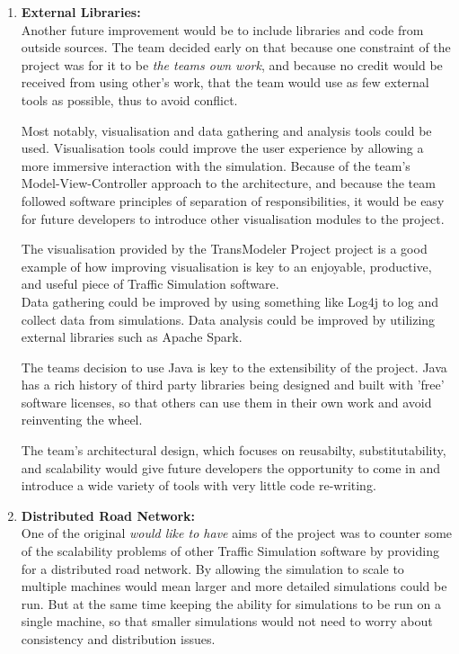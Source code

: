 \documentclass[11pt]{article}
\begin{document}
{\begin{enumerate}
\begin{enumerate}
	\item \textbf{External Libraries:}
	\\
	
	Another future improvement would be to include libraries and code from outside sources. The team decided early on that because one constraint of the project was for it to be \textit{the teams own work}, and because no credit would be received from using other's work, that the team would use as few external tools as possible, thus to avoid conflict. 
	
	Most notably, visualisation and data gathering and analysis tools could be used. Visualisation tools could improve the user experience by allowing a more immersive interaction with the simulation. Because of the team's Model-View-Controller approach to the architecture, and because the team followed software principles of separation of responsibilities, it would be easy for future developers to introduce other visualisation modules to the project.
	
	The visualisation provided by the TransModeler Project project \cite{website:caliper.com-transmodeler} is a good example of how improving visualisation is key to an enjoyable, productive, and useful piece of Traffic Simulation software.
	\\ Data gathering could be improved by using something like Log4j \cite{website:Apache-Log4j} to log and collect data from simulations. Data analysis could be improved by utilizing external libraries such as Apache Spark.
	
	The teams decision to use Java is key to the extensibility of the project. Java has a rich history of third party libraries being designed and built with 'free' software licenses, so that others can use them in their own work and avoid reinventing the wheel.
	
	The team's architectural design, which focuses on reusabilty, substitutability, and scalability would give future developers the opportunity to come in and introduce a wide variety of tools with very little code re-writing.\\
	
	\item \textbf{Distributed Road Network:}
	\\
	
	One of the original \textit{would like to have} aims of the project was to counter some of the scalability problems of other Traffic Simulation software \cite{SewWilMer10} by providing for a distributed road network. By allowing the simulation to scale to multiple machines would mean larger and more detailed simulations could be run. But at the same time keeping the ability for simulations to be run on a single machine, so that smaller simulations would not need to worry about consistency and distribution issues.
	

\end{enumerate}
\end{enumerate}}
\end{document}
